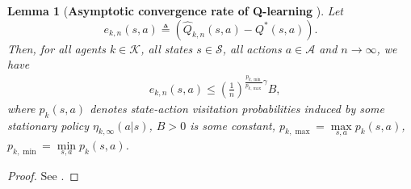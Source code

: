 \documentclass[lettersize,journal]{IEEEtran}
\newtheorem{lemma}{Lemma}
\begin{document}
\begin{appendices}
\begin{lemma} [\textbf{Asymptotic convergence rate of Q-learning} \cite{Q_rate}]
\label{lemma:Q_rate}
Let $$e_{k,n}(s,a)\triangleq\left (\widehat{Q}_{k,n}(s,a)-Q^*(s,a)\right).$$
 Then, for all agents $k\in\mathcal{K}$, all states $s \in \mathcal{S}$, all actions $a\in \mathcal{A}$ and $n\to \infty$, we have 
  \begin{equation}
\label{eq:error_ap}
\begin{aligned}
&e_{k,n}(s,a)\leq \left(\frac{1}{n}\right)^{\frac{p_{k,\min}}{p_{k,\max}}\gamma}B,
\end{aligned}
\end{equation}
where $p_{k}(s,a)$ denotes 
state-action visitation probabilities induced by some stationary policy $\eta_{k,\infty}(a|s)$, $B>0$ is some constant, $p_{k,\max}=\max\limits_{s,a} p_k(s,a)$,  $p_{k,\min}=\min \limits_{s,a} p_k(s,a)$. 
 \end{lemma}
 \begin{proof}
 See \cite{Q_rate}.
 \end{proof}

\end{appendices}
\end{document}
